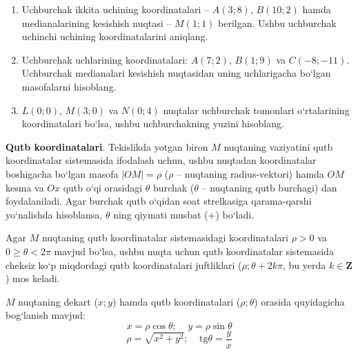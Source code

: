 \begin{enumerate}
	\item Uchburchak ikkita uchining koordinatalari -- $A(3;8)$, $B(10;2)$ hamda medianalarining kesishish nuqtasi -- $M(1;1)$ berilgan. Ushbu uchburchak uchinchi uchining koordinatalarini aniqlang.
	
	\item Uchburchak uchlarining koordinatalari: $A(7;2)$, $B(1;9)$ va $C(-8;-11)$. Uchburchak medianalari kesishish nuqtasidan uning uchlarigacha bo`lgan masofalarni hisoblang.
	
	\item $L(0;0)$, $M(3;0)$ va $N(0;4)$ nuqtalar uchburchak tomonlari o`rtalarining koordinatalari bo`lsa, ushbu uchburchakning yuzini hisoblang.
\end{enumerate}	
\textbf{Qutb koordinatalari}. Tekislikda yotgan biron $M$ nuqtaning vaziyatini qutb koordinatalar sistemasida ifodalash uchun, ushbu nuqtadan koordinatalar boshigacha bo`lgan masofa $|OM|=\rho$ ($\rho$ -- nuqtaning radius-vektori) hamda $OM$ kesma va $Ox$ qutb o`qi orasidagi $\theta$ burchak ($\theta$ -- nuqtaning qutb burchagi) dan foydalaniladi. Agar burchak qutb o`qidan soat strelkasiga qarama-qarshi yo`nalishda hisoblansa,  $\theta$ ning qiymati musbat (+) bo`ladi. 

Agar $M$ nuqtaning qutb koordinatalar sistemasidagi koordinatalari $\rho>0$ va $0\ge\theta<2\pi$ mavjud bo`lsa, ushbu nuqta uchun qutb koordinatalar sistemasida cheksiz ko`p miqdordagi qutb koordinatalari juftliklari ($\rho; \theta+2k\pi$, bu yerda $k\in\mathbf{Z}$) mos keladi.

$M$ nuqtaning dekart ($x;y$) hamda qutb koordinatalari ($\rho;\theta$) orasida quyidagicha bog`lanish mavjud:
\begin{equation}
	x=\rho\cos\theta;\ \ \ \ \ y=\rho\sin\theta
	\label{10}
\end{equation}
\begin{equation}
	\rho=\sqrt{x^{2}+y^{2}};\ \ \ \ \ \textrm{tg}\theta=\frac{y}{x}
	\label{11}
\end{equation}

